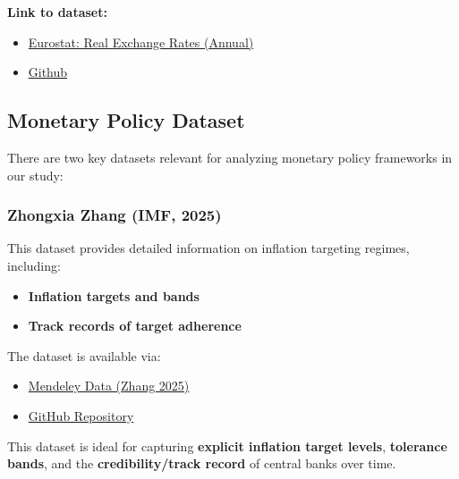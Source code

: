 \documentclass[
  11pt,
]{article}
\providecommand{\tightlist}{%
  \setlength{\itemsep}{0pt}\setlength{\parskip}{0pt}}
\begin{document}
\textbf{Link to dataset:}

\begin{itemize}
\tightlist
\item
  \href{https://ec.europa.eu/eurostat/databrowser/view/ert_bil_eur_a/default/table?lang=en}{Eurostat:
  Real Exchange Rates (Annual)}
\item
  \href{https://github.com/WilliamClintC/RER/tree/main/data/Eurostat/estat_ert_bil_eur_a_en.csv}{Github}
\end{itemize}

\subsection{Monetary Policy Dataset}\label{monetary-policy-dataset}

There are two key datasets relevant for analyzing monetary policy
frameworks in our study:

\subsubsection{Zhongxia Zhang (IMF,
2025)}\label{zhongxia-zhang-imf-2025}

This dataset provides detailed information on inflation targeting
regimes, including:

\begin{itemize}
\tightlist
\item
  \textbf{Inflation targets and bands}
\item
  \textbf{Track records of target adherence}
\end{itemize}

The dataset is available via:

\begin{itemize}
\tightlist
\item
  \href{https://data.mendeley.com/datasets/g9m7rnvtw7/2?utm_source}{Mendeley
  Data (Zhang 2025)}
\item
  \href{https://github.com/WilliamClintC/RER/blob/main/data/Inflation\%20Targeting\%20Dataset\%20Inflation\%20Targets\%2C\%20Bands\%2C\%20and\%20Track\%20Records/Inflation\%20targeting\%20dataset_Zhang\%202025\%20May\%20online\%20version.xlsx}{GitHub
  Repository}
\end{itemize}

This dataset is ideal for capturing \textbf{explicit inflation target
levels}, \textbf{tolerance bands}, and the \textbf{credibility/track
record} of central banks over time.
\end{document}
